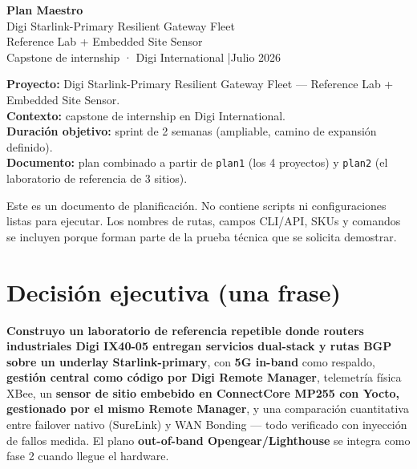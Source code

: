 \documentclass[11pt,a4paper]{article}
\begin{document}
\begin{center}
  {\Huge\bfseries\color{accentdark} Plan Maestro}\\[6pt]
  {\large Digi Starlink-Primary Resilient Gateway Fleet}\\[2pt]
  {\normalsize Reference Lab + Embedded Site Sensor}\\[10pt]
  {\small Capstone de internship · Digi International \quad|\quad Julio 2026}
\end{center}

\vspace{4pt}
\begin{nota}
\small
\textbf{Proyecto:} Digi Starlink-Primary Resilient Gateway Fleet — Reference Lab + Embedded Site Sensor.\\
\textbf{Contexto:} capstone de internship en Digi International.\\
\textbf{Duración objetivo:} sprint de 2 semanas (ampliable, camino de expansión definido).\\
\textbf{Documento:} plan combinado a partir de \texttt{plan1} (los 4 proyectos) y \texttt{plan2} (el laboratorio de referencia de 3 sitios).
\end{nota}

\begin{nota}
\small
Este es un documento de planificación. No contiene scripts ni configuraciones listas para ejecutar. Los nombres de rutas, campos CLI/API, SKUs y comandos se incluyen porque forman parte de la prueba técnica que se solicita demostrar.
\end{nota}

\vspace{2pt}
{\small\tableofcontents}
\vspace{6pt}

\section{Decisión ejecutiva (una frase)}

\begin{clave}
\textbf{Construyo un laboratorio de referencia repetible donde routers industriales Digi IX40-05 entregan servicios dual-stack y rutas BGP sobre un underlay Starlink-primary}, con \textbf{5G in-band} como respaldo, \textbf{gestión central como código por Digi Remote Manager}, telemetría física XBee, un \textbf{sensor de sitio embebido en ConnectCore MP255 con Yocto, gestionado por el mismo Remote Manager}, y una comparación cuantitativa entre failover nativo (SureLink) y WAN Bonding — todo verificado con inyección de fallos medida. El plano \textbf{out-of-band Opengear/Lighthouse} se integra como fase 2 cuando llegue el hardware.
\end{clave}
\end{document}
